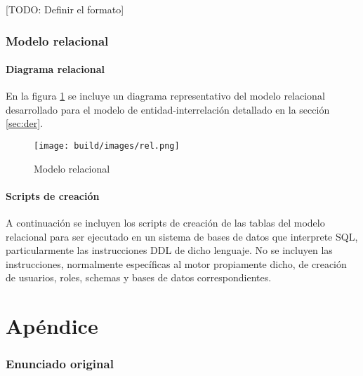 \documentclass[a4paper,11pt]{article}
\begin{document}
[TODO: Definir el formato]

\section{Modelo relacional}

\subsection{Diagrama relacional}

En la figura \ref{fig:relacional} se incluye un diagrama representativo del
modelo relacional desarrollado para el modelo de entidad-interrelación
detallado en la sección \ref{sec:der}.

\begin{figure}[h!t]
  \centering
  \texttt{[image: build/images/rel.png]}
  \caption{Modelo relacional} \label{fig:relacional}
\end{figure}

\FloatBarrier

\subsection{Scripts de creación}

A continuación se incluyen los scripts de creación de las tablas del modelo
relacional para ser ejecutado en un sistema de bases de datos que interprete
SQL, particularmente las instrucciones DDL de dicho lenguaje. No se incluyen
las instrucciones, normalmente específicas al motor propiamente dicho, de
creación de usuarios, roles, schemas y bases de datos correspondientes.



\clearpage

\part{Apéndice}
\appendix

\section{Enunciado original}\label{sec:enunciado}

\end{document}
